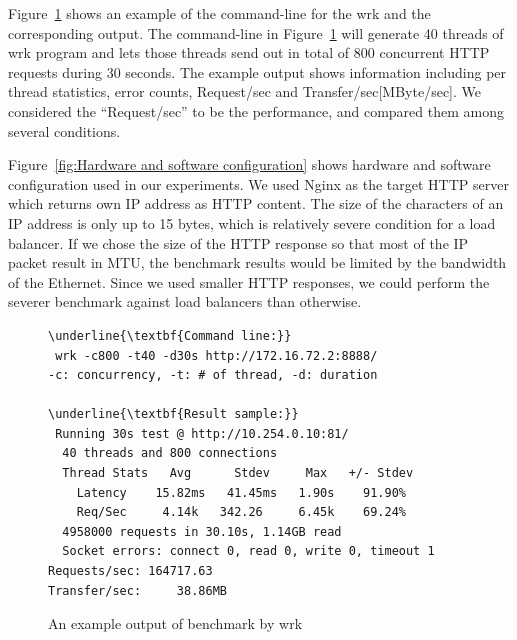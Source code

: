 Figure~\ref{fig:benchmark example} shows an example of the command-line for the wrk and the corresponding output.
The command-line in Figure~\ref{fig:benchmark example} will generate 40 threads of wrk program 
and lets those threads send out in total of 800 concurrent HTTP requests during 30 seconds.
The example output shows information including per thread statistics, error counts, Request/sec and Transfer/sec[MByte/sec].
We considered the \enquote{Request/sec} to be the performance, and compared them among several conditions.

Figure~\ref{fig:Hardware and software configuration} shows hardware and software configuration used in our experiments.
We used Nginx as the target HTTP server which returns own IP address as HTTP content. 
The size of the characters of an IP address is only up to 15 bytes, 
which is relatively severe condition for a load balancer.
If we chose the size of the HTTP response so that most of the IP packet result in MTU,
the benchmark results would be limited by the bandwidth of the Ethernet.
Since we used smaller HTTP responses, we could perform the severer benchmark against load balancers than otherwise.

\begin{figure}
\begin{minipage}{\columnwidth}
\small
\begin{Verbatim}[commandchars=\\\{\}]
\underline{\textbf{Command line:}}
 wrk -c800 -t40 -d30s http://172.16.72.2:8888/
-c: concurrency, -t: # of thread, -d: duration

\underline{\textbf{Result sample:}}
 Running 30s test @ http://10.254.0.10:81/
  40 threads and 800 connections
  Thread Stats   Avg      Stdev     Max   +/- Stdev
    Latency    15.82ms   41.45ms   1.90s    91.90%
    Req/Sec     4.14k   342.26     6.45k    69.24%
  4958000 requests in 30.10s, 1.14GB read
  Socket errors: connect 0, read 0, write 0, timeout 1
Requests/sec: 164717.63
Transfer/sec:     38.86MB
\end{Verbatim}
\end{minipage}
\caption{An example output of benchmark by wrk}
\label{fig:benchmark example}
\end{figure}

